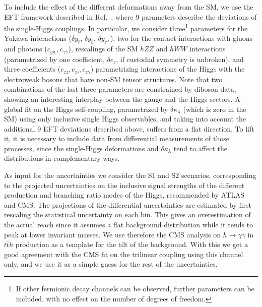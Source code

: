 To include the effect of the different deformations away from the SM, we use the EFT framework described in Ref.~\cite{DiVita:2017eyz}, where 9 parameters describe the deviations of the single-Higgs couplings. In particular, we consider three\footnote{If other fermionic decay channels can be observed, further parameters can be included, with no effect on the number of degrees of freedom.} parameters for the Yukawa interactions ($\delta y_t,\,\delta y_b,\,\delta y_\tau,$), two for the contact interactions with gluons and photons ($c_{gg}\,,c_{\gamma\gamma}$), rescalings of the SM $hZZ$ and $hWW$ interactions (parametrized by one coefficient, $\delta c_z$, if custodial symmetry is unbroken), and three coefficients ($c_{zz},c_{z\square},c_{z\gamma}$) parametrizing interactions of the Higgs with the electroweak bosons that have non-SM tensor structures. Note that two combinations of the last three parameters are constrained by diboson data, showing an interesting interplay between the gauge and the Higgs sectors. A global fit on the Higgs self-coupling, parametrized by $\delta\kappa_\lambda$ (which is zero in the SM) using only inclusive single Higgs observables, and taking into account the additional 9 EFT deviations described above, suffers from a flat direction. To lift it, it is necessary to include data from differential measurements of those processes, since the single-Higgs deformations and $\delta\kappa_\lambda$ tend to affect the distributions in complementary ways.
\medskip

As input for the uncertainties we consider the S1 and S2 scenarios, corresponding to the projected uncertainties on the inclusive signal strengths of the different production and branching ratio modes of the Higgs, recommended by ATLAS and CMS. The projections of the differential uncertainties are estimated by first rescaling the statistical uncertainty on each bin. This gives an overestimation of the actual reach since it assumes a flat background distribution while it tends to peak at lower invariant masses. We use therefore the CMS analysis on $h\to \gamma \gamma$ in $t\bar{t} h$ production as a template for the tilt of the background. With this we get a good agreement with the CMS fit on the trilinear coupling using this channel only, and we use it as a simple guess for the rest of the uncertainties.
\medskip

